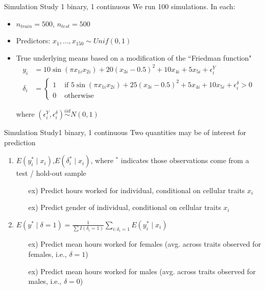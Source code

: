 \documentclass{beamer}
\begin{document}
\begin{frame}{Simulation Study }{1 binary, 1 continuous}
We run 100 simulations. In each:
\begin{itemize}
\item $n_{train} = 500$, $n_{test} = 500$
\item Predictors: $x_1, \hdots, x_{150} \sim Unif(0,1)$
\item True underlying means based on a modification of the ``Friedman function"
\begin{align*}
y_i &= 10 \sin (\pi x_{1i} x_{2i}) + 20(x_{3i} - 0.5)^2 + 10x_{4i} + 5x_{5i} +
\epsilon_i^Y\\
\delta_i &= \begin{cases}1 &\text{ if }5 \sin (\pi x_{1i} x_{2i}) + 25(x_{3i} - 0.5)^2 + 5x_{4i} + 10x_{5i} +
\epsilon_i^{\delta} > 0 \\
                          0 & \text{ otherwise}\end{cases}
\end{align*}

where $(\epsilon_i^Y, \epsilon_i^{\delta}) \overset{iid}{\sim} N(0,1)$

\end{itemize}



\end{frame}

\begin{frame}{Simulation Study}{1 binary, 1 continuous }
Two quantities may be of interest for prediction
\begin{enumerate}
\item $E( y_i^* \mid x_i)$,$E(\delta_i^* \mid x_i)$, where $^*$ indicates those observations come from a test / hold-out sample
  \begin{itemize}
    \item[ex)] Predict hours worked for individual, conditional on cellular traits $x_i$
    \item[ex)] Predict gender of individual, conditional on cellular traits $x_i$
  \end{itemize}
\item $E(y^* \mid \delta = 1) = \frac{1}{\sum I(\delta_i = 1)}\sum_{i: \delta_i = 1}E(y_i^* \mid x_i)$
  \begin{itemize}
    \item[ex)] Predict mean hours worked for females (avg. across traits observed for females, i.e., $\delta = 1$)
    \item[ex)] Predict mean hours worked for males (avg. across traits observed for males, i.e., $\delta = 0$)
  \end{itemize}
\end{enumerate}
\end{frame}
\end{document}
